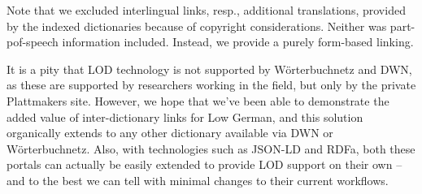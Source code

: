 \documentclass{article}
\begin{document}
Note that we excluded interlingual links, resp., additional translations, provided by the indexed dictionaries because of copyright considerations. Neither was part-pof-speech information included. Instead, we provide a purely form-based linking.



It is a pity that LOD technology is not supported by Wörterbuchnetz and DWN, as these are supported by researchers working in the field, but only by the private Plattmakers site. However, we hope that we've been able to demonstrate the added value of inter-dictionary links for Low German, and this solution organically extends to any other dictionary available via DWN or Wörterbuchnetz. Also, with technologies such as JSON-LD and RDFa, both these portals can actually be easily extended to provide LOD support on their own -- and to the best we can tell with minimal changes to their current workflows.
\end{document}
